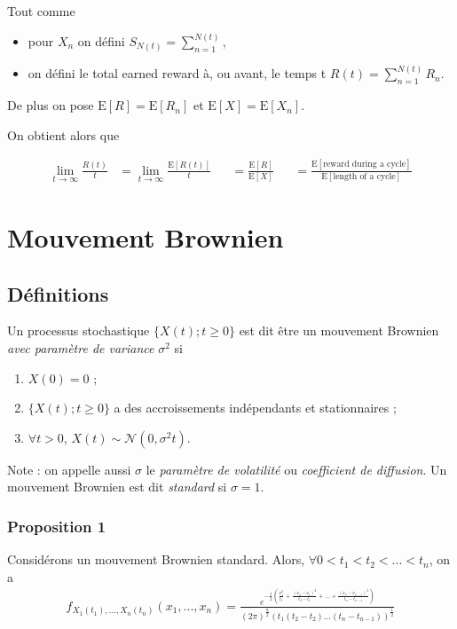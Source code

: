 \documentclass[10pt, french, landscape]{article}
\begin{document}
\begin{multicols*}{2}
Tout comme 
\begin{itemize}
	\item	pour $X_{n}$ on défini $S_{N(t)} = \sum_{n = 1}^{N(t)}$, 
	\item	on défini le total earned reward à, ou avant, le temps t $R(t) = \sum_{n = 1}^{N(t)} R_{n}$.
\end{itemize}

De plus on pose $\text{E}[R] = \text{E}[R_{n}]$ et $\text{E}[X] = \text{E}[X_{n}]$.

On obtient alors que 
\begin{definition}[Définition]
\begin{align*}
	\underset{t \rightarrow \infty}{\lim} \frac{R(t)}{t}	
	&=	\underset{t \rightarrow \infty}{\lim} \frac{\text{E}[R(t)]}{t}	&
	&=	\frac{\text{E}[R]}{\text{E}[X]}	&
	&=	\frac{\text{E}[\text{reward during a cycle}]}{\text{E}[\text{length of a cycle}]}
\end{align*}
\end{definition}



\section{Mouvement Brownien}
\subsection*{Définitions}
\begin{definition}
Un processus stochastique $\{ X(t) ; t \geq 0 \}$ est dit être un mouvement Brownien \emph{avec paramètre de variance} $\sigma^2$ si
\begin{enumerate}[label=(\arabic*)]
\item $X(0) = 0$ ;
\item $\{ X(t) ; t \geq 0 \}$  a des accroissements indépendants et stationnaires ;
\item $\forall t > 0$, $X(t) \sim \mathcal{N}(0, \sigma^2 t)$.
\end{enumerate}
\end{definition}
Note : on appelle aussi $\sigma$ le \emph{paramètre de volatilité} ou \emph{coefficient de diffusion}. Un mouvement Brownien est dit \emph{standard} si $\sigma = 1$.

\subsubsection*{Proposition 1}
Considérons un mouvement Brownien standard. Alors, $\forall 0 < t_1 < t_2 < ... < t_{n}$, on a
\begin{align*}
f_{X_1(t_1), ..., X_n(t_n)}(x_1, ..., x_n) = \frac{e^{-\frac{1}{2} \left(\frac{x_1^2}{t_1} + \frac{(x_2 - x_1)^2}{t_2 - t_1} + ... + \frac{(x_n - x_{n-1})^2}{t_n - t_{n-1}} \right)}}{(2 \pi)^{\frac{n}{2}} (t_1 (t_2 - t_2) ... (t_n - t_{n-1}))^{\frac{1}{2}}} 
\end{align*}


\end{multicols*}
\end{document}
